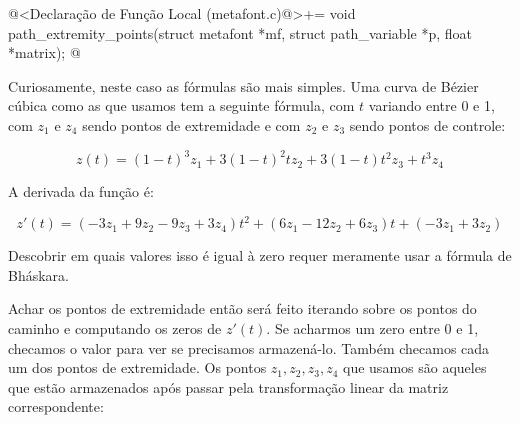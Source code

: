 {{{{{{\iniciocodigo
@<Declaração de Função Local (metafont.c)@>+=
void path_extremity_points(struct metafont *mf, struct path_variable *p,
                           float *matrix);
@
\fimcodigo

Curiosamente, neste caso as fórmulas são mais simples. Uma curva de
Bézier cúbica como as que usamos tem a seguinte fórmula, com $t$
variando entre 0 e 1, com $z_1$ e $z_4$ sendo pontos de extremidade e
com  $z_2$ e $z_3$ sendo pontos de controle:

$$
z(t) = (1-t)^3z_1+3(1-t)^2tz_2+3(1-t)t^2z_3+t^3z_4
$$

A derivada da função é:

$$
z'(t) = (-3z_1+9z_2-9z_3+3z_4)t^2+(6z_1-12z_2+6z_3)t+(-3z_1+3z_2)
$$

Descobrir em quais valores isso é igual à zero requer meramente usar a
fórmula de Bháskara.

Achar os pontos de extremidade então será feito iterando sobre os
pontos do caminho e computando os zeros de $z'(t)$. Se acharmos um
zero entre 0 e 1, checamos o valor para ver se precisamos
armazená-lo. Também checamos cada um dos pontos de extremidade. Os
pontos $z_1, z_2, z_3, z_4$ que usamos são aqueles que estão
armazenados após passar pela transformação linear da matriz
correspondente:

}}}}}}

